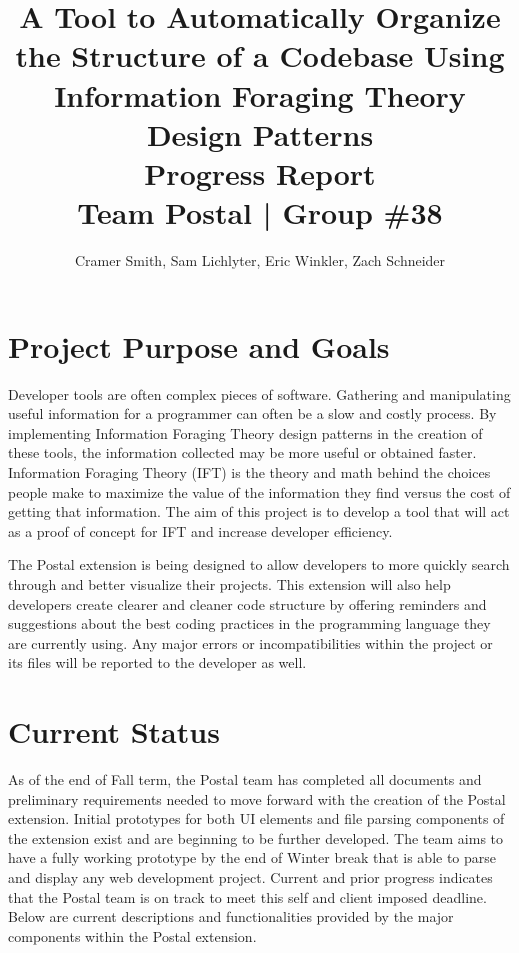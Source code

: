 \documentclass[letterpaper,10pt,titlepage,draftclsnofoot,onecolumn,onesided] {IEEEtran}
\def\doctitle{A Tool to Automatically Organize the Structure of a Codebase Using Information Foraging Theory Design Patterns}
\def\doctype{Progress Report}
\def\team{Team Postal | Group \#38}
\begin{document}
\title{\Huge{\bfseries{\textsf{\doctitle}}}\\\textsf{\Large{\doctype}}\\\textsf{\large{\team}}}
\author{Cramer Smith, Sam Lichlyter, Eric Winkler, Zach Schneider}

\maketitle
\vfill

\vfill

\pagebreak

\tableofcontents


\pagebreak

\section{Project Purpose and Goals}
Developer tools are often complex pieces of software. 
Gathering and manipulating useful information for a programmer can often be a slow and costly process. 
By implementing Information Foraging Theory design patterns in the creation of these tools, the information collected may be more useful or obtained faster. 
Information Foraging Theory (IFT) is the theory and math behind the choices people make to maximize the value of the information they find versus the cost of getting that information.
The aim of this project is to develop a tool that will act as a proof of concept for IFT and increase developer efficiency.

The Postal extension is being designed to allow developers to more quickly search through and better visualize their projects.
This extension will also help developers create clearer and cleaner code structure by offering reminders and suggestions about the best coding practices in the programming language they are currently using.
Any major errors or incompatibilities within the project or its files will be reported to the developer as well.


\section{Current Status}

As of the end of Fall term, the Postal team has completed all documents and preliminary requirements needed to move forward with the creation of the Postal extension. 
Initial prototypes for both UI elements and file parsing components of the extension exist and are beginning to be further developed. 
The team aims to have a fully working prototype by the end of Winter break that is able to parse and display any web development project.
Current and prior progress indicates that the Postal team is on track to meet this self and client imposed deadline.
Below are current descriptions and functionalities provided by the major components within the Postal extension.
\end{document}
